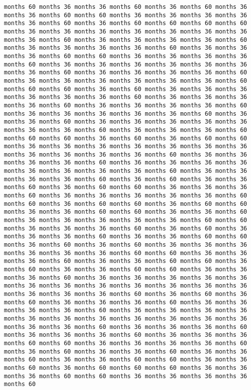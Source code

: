 \documentclass[11pt]{article}
\begin{document}
\begin{Verbatim}[commandchars=\\\{\}, frame=single, framerule=2mm, rulecolor=\color{outerrorbackground}]
months 60 months 36 months 36 months 60 months 36 months 60 months 36 months 36 months 60 months 60 months 36 months 36 months 36 months 36 months 36 months 60 months 36 months 60 months 60 months 60 months 60 months 36 months 36 months 36 months 36 months 36 months 36 months 36 months 36 months 60 months 36 months 36 months 36 months 36 months 60 months 36 months 36 months 36 months 36 months 60 months 36 months 36 months 36 months 60 months 60 months 36 months 36 months 36 months 36 months 60 months 36 months 36 months 36 months 36 months 36 months 36 months 36 months 60 months 36 months 36 months 36 months 36 months 60 months 36 months 36 months 36 months 36 months 36 months 36 months 60 months 60 months 60 months 36 months 60 months 36 months 36 months 36 months 36 months 36 months 36 months 60 months 36 months 36 months 36 months 36 months 60 months 36 months 36 months 36 months 36 months 60 months 36 months 36 months 36 months 36 months 36 months 60 months 36 months 36 months 60 months 36 months 36 months 36 months 36 months 36 months 36 months 36 months 60 months 36 months 36 months 36 months 60 months 60 months 60 months 36 months 60 months 36 months 60 months 60 months 36 months 36 months 36 months 36 months 36 months 36 months 36 months 36 months 36 months 36 months 36 months 60 months 36 months 36 months 36 months 36 months 60 months 36 months 36 months 36 months 36 months 36 months 36 months 36 months 36 months 60 months 36 months 36 months 36 months 36 months 60 months 36 months 60 months 36 months 36 months 60 months 36 months 60 months 60 months 36 months 36 months 36 months 60 months 36 months 36 months 36 months 36 months 36 months 60 months 60 months 36 months 60 months 60 months 36 months 60 months 60 months 36 months 36 months 60 months 60 months 36 months 36 months 60 months 36 months 36 months 36 months 36 months 36 months 60 months 60 months 36 months 36 months 36 months 60 months 36 months 60 months 36 months 36 months 36 months 60 months 36 months 36 months 60 months 60 months 36 months 60 months 36 months 60 months 36 months 36 months 36 months 36 months 36 months 36 months 60 months 60 months 36 months 36 months 36 months 60 months 36 months 36 months 60 months 60 months 36 months 60 months 36 months 36 months 60 months 60 months 36 months 36 months 36 months 60 months 36 months 36 months 36 months 36 months 36 months 36 months 36 months 36 months 36 months 36 months 36 months 36 months 36 months 36 months 36 months 60 months 36 months 60 months 36 months 60 months 36 months 36 months 36 months 60 months 36 months 36 months 36 months 36 months 60 months 36 months 36 months 36 months 36 months 36 months 36 months 36 months 36 months 36 months 36 months 36 months 36 months 36 months 60 months 36 months 36 months 36 months 60 months 36 months 36 months 36 months 60 months 36 months 36 months 36 months 60 months 60 months 36 months 36 months 36 months 36 months 60 months 36 months 60 months 36 months 36 months 60 months 36 months 36 months 60 months 36 months 36 months 60 months 60 months 36 months 36 months 60 months 36 months 60 months 60 months 60 months 36 months 36 months 36 months 60 months 60 months 36 months 36 months 36 months 36 months 60 
\end{Verbatim}
\end{document}
